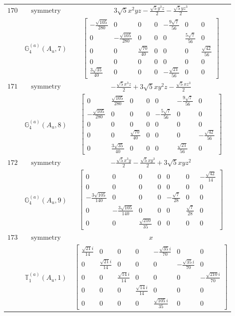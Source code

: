 \documentclass[fleqn,8pt,landscape]{jsarticle}
\begin{document}
\begin{longtable}{ccc}
$ 170 $ & $ \text{symmetry} $ & $ 3 \sqrt{5} x^{2} y z - \frac{\sqrt{5} y^{3} z}{2} - \frac{\sqrt{5} y z^{3}}{2} $ \\
$  $ & $ \mathbb{G}_{4}^{(a)}(A_{u},7) $ & $ \begin{bmatrix} - \frac{\sqrt{105}}{280} & 0 & 0 & 0 & - \frac{9 \sqrt{7}}{56} & 0 & 0 \\ 0 & - \frac{\sqrt{105}}{280} & 0 & 0 & 0 & \frac{5 \sqrt{7}}{56} & 0 \\ 0 & 0 & \frac{\sqrt{70}}{40} & 0 & 0 & 0 & \frac{\sqrt{42}}{56} \\ 0 & 0 & 0 & 0 & 0 & 0 & 0 \\ \frac{3 \sqrt{35}}{40} & 0 & 0 & 0 & - \frac{\sqrt{21}}{56} & 0 & 0 \end{bmatrix} $ \\ \hline
$ 171 $ & $ \text{symmetry} $ & $ - \frac{\sqrt{5} x^{3} z}{2} + 3 \sqrt{5} x y^{2} z - \frac{\sqrt{5} x z^{3}}{2} $ \\
$  $ & $ \mathbb{G}_{4}^{(a)}(A_{u},8) $ & $ \begin{bmatrix} 0 & \frac{\sqrt{105}}{280} & 0 & 0 & 0 & - \frac{9 \sqrt{7}}{56} & 0 \\ - \frac{\sqrt{105}}{280} & 0 & 0 & 0 & - \frac{5 \sqrt{7}}{56} & 0 & 0 \\ 0 & 0 & 0 & 0 & 0 & 0 & 0 \\ 0 & 0 & \frac{\sqrt{70}}{40} & 0 & 0 & 0 & - \frac{\sqrt{42}}{56} \\ 0 & \frac{3 \sqrt{35}}{40} & 0 & 0 & 0 & \frac{\sqrt{21}}{56} & 0 \end{bmatrix} $ \\ \hline
$ 172 $ & $ \text{symmetry} $ & $ - \frac{\sqrt{5} x^{3} y}{2} - \frac{\sqrt{5} x y^{3}}{2} + 3 \sqrt{5} x y z^{2} $ \\
$  $ & $ \mathbb{G}_{4}^{(a)}(A_{u},9) $ & $ \begin{bmatrix} 0 & 0 & 0 & 0 & 0 & 0 & - \frac{\sqrt{42}}{14} \\ 0 & 0 & 0 & 0 & 0 & 0 & 0 \\ - \frac{3 \sqrt{105}}{140} & 0 & 0 & 0 & - \frac{\sqrt{7}}{28} & 0 & 0 \\ 0 & - \frac{3 \sqrt{105}}{140} & 0 & 0 & 0 & \frac{\sqrt{7}}{28} & 0 \\ 0 & 0 & \frac{\sqrt{210}}{35} & 0 & 0 & 0 & 0 \end{bmatrix} $ \\ \hline
$ 173 $ & $ \text{symmetry} $ & $ x $ \\
$  $ & $ \mathbb{T}_{1}^{(a)}(A_{u},1) $ & $ \begin{bmatrix} \frac{\sqrt{21} i}{14} & 0 & 0 & 0 & - \frac{\sqrt{35} i}{70} & 0 & 0 \\ 0 & \frac{\sqrt{21} i}{14} & 0 & 0 & 0 & - \frac{\sqrt{35} i}{70} & 0 \\ 0 & 0 & \frac{\sqrt{14} i}{14} & 0 & 0 & 0 & - \frac{\sqrt{210} i}{70} \\ 0 & 0 & 0 & \frac{\sqrt{14} i}{14} & 0 & 0 & 0 \\ 0 & 0 & 0 & 0 & \frac{\sqrt{105} i}{35} & 0 & 0 \end{bmatrix} $ \\ \hline

\end{longtable}
\end{document}
